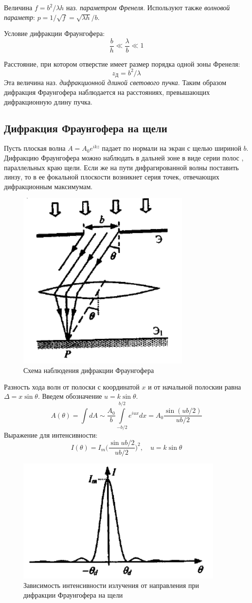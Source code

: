 \documentclass[a4paper,12pt]{article}
\begin{document}
Величина $f=b^2/\lambda h$ наз. \textit{параметром Френеля}. Используют также \textit{волновой параметр}: $p=1/\sqrt{f}=\sqrt{\lambda h}/b$.

Условие дифракции Фраунгофера:
$$
\frac{b}{h}\ll \frac{\lambda}{b}\ll 1
$$

Расстояние, при котором отверстие имеет размер порядка одной зоны Френеля:
$$
z_\text{Д}=b^2/\lambda
$$
Эта величина наз. \textit{дифракционной длиной светового пучка}. Таким образом дифракция Фраунгофера наблюдается на расстояниях, превышающих дифракционную длину пучка.

\subsection{Дифракция Фраунгофера на щели}

Пусть плоская волна $A=A_0e^{ikz}$ падает по нормали на экран с щелью шириной $b$. Дифракцию Фраунгофера можно наблюдать в дальней зоне в виде серии полос , параллельных краю щели. Если же на пути дифрагированной волны поставить линзу, то в ее фокальной плоскости возникнет серия точек, отвечающих дифракционным максимумам.

\begin{figure}[h]
\centering
\includegraphics[width=0.2\linewidth]{img12.png}
\caption{Схема наблюдения дифракции Фраунгофера}
\label{img12}
\end{figure}

Разность хода волн от полоски с координатой $x$ и от начальной полоскии равна $\Delta =x\sin{\theta}$. Введем обозначение $u=k\sin{\theta}$.
$$
A(\theta)=\int dA\sim \frac{A_0}{b}\int\limits_{-b/2}^{b/2}e^{iux}dx=A_0\frac{\sin(ub/2)}{ub/2}
$$
Выражение для интенсивности:
$$
I(\theta)=I_m\Big(\frac{\sin{ub/2}}{ub/2}\Big)^2, \quad u=k\sin{\theta}
$$

\begin{figure}[h]
\centering
\includegraphics[width=0.4\linewidth]{img13.png}
\caption{Зависимость интенсивности излучения от направления при дифракции Фраунгофера на щели}
\label{img13}
\end{figure}
\end{document}

